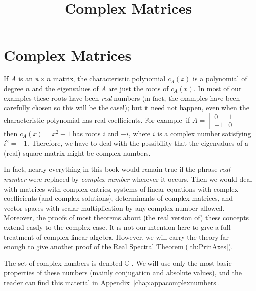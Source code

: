 \documentclass{ximera}
\title{Complex Matrices} \license{CC BY-NC-SA 4.0}
\begin{document}
\begin{abstract}
\end{abstract}
\maketitle

\section*{Complex Matrices}
If $A$ is an $n \times n$ matrix, the characteristic polynomial $c_{A}(x)$ is a polynomial of degree $n$ and the eigenvalues of $A$ are just the roots of $c_{A}(x)$. In most of our examples these roots have been \textit{real} numbers (in fact, the examples have been carefully chosen so this will be the case!); but it need not happen, even when the characteristic polynomial has real coefficients. For example, if $A = \left[ \begin{array}{rr}
0 & 1 \\
-1 & 0
\end{array}\right]$ then $c_{A}(x) = x^{2} + 1$ has roots $i$ and $-i$, where $i$ is a complex number satisfying $i^{2} = -1$. Therefore, we have to deal with the possibility that the eigenvalues of a (real) square matrix might be complex numbers.

In fact, nearly everything in this book would remain true if the phrase \textit{real number} were replaced by \textit{complex number}
 wherever it occurs. Then we would deal with matrices with complex
entries, systems of linear equations with complex coefficients (and
complex solutions), determinants of complex matrices, and vector spaces
with scalar multiplication by any complex number allowed. Moreover, the
proofs of most theorems about (the real version of) these concepts
extend easily to the complex case. It is not our intention here to give a
 full treatment of complex linear algebra. However, we will carry the
theory far enough to give another proof of the Real Spectral Theorem (\ref{th:PrinAxes}).

The set of complex numbers is denoted $\mathbb{C}$ . We will use only the most basic properties of these numbers (mainly conjugation and absolute values), and the reader can find this material in Appendix~\ref{chap:appacomplexnumbers}.
\end{document}
